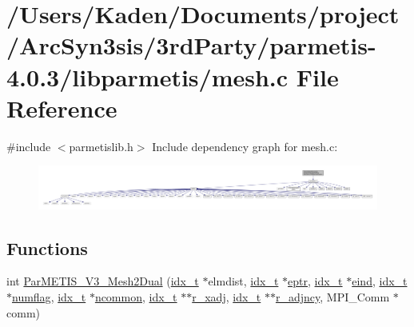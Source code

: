 \hypertarget{a00930}{}\section{/\+Users/\+Kaden/\+Documents/project/\+Arc\+Syn3sis/3rd\+Party/parmetis-\/4.0.3/libparmetis/mesh.c File Reference}
\label{a00930}
{\ttfamily \#include $<$parmetislib.\+h$>$}\newline
Include dependency graph for mesh.\+c\+:\nopagebreak
\begin{figure}[H]
\begin{center}
\leavevmode
\includegraphics[width=350pt]{a00931}
\end{center}
\end{figure}
\subsection*{Functions}
\begin{DoxyCompactItemize}
\item 
int \hyperlink{a00930_ab2b3727a0cfbdf8b75768c33487fa9f4}{Par\+M\+E\+T\+I\+S\+\_\+\+V3\+\_\+\+Mesh2\+Dual} (\hyperlink{a00876_aaa5262be3e700770163401acb0150f52}{idx\+\_\+t} $\ast$elmdist, \hyperlink{a00876_aaa5262be3e700770163401acb0150f52}{idx\+\_\+t} $\ast$\hyperlink{a00879_af3ca47b5acd610d8d94e45e3480b2583}{eptr}, \hyperlink{a00876_aaa5262be3e700770163401acb0150f52}{idx\+\_\+t} $\ast$\hyperlink{a00879_af06d5753771b844d01c4c20e75c6401b}{eind}, \hyperlink{a00876_aaa5262be3e700770163401acb0150f52}{idx\+\_\+t} $\ast$\hyperlink{a00879_aa48ecaf34ec788199c3aedb2b1558eb7}{numflag}, \hyperlink{a00876_aaa5262be3e700770163401acb0150f52}{idx\+\_\+t} $\ast$\hyperlink{a00879_a1a215d5e3b7fb6675cd2e6266772b752}{ncommon}, \hyperlink{a00876_aaa5262be3e700770163401acb0150f52}{idx\+\_\+t} $\ast$$\ast$\hyperlink{a00879_ab92af26e448291b7932687dee45298df}{r\+\_\+xadj}, \hyperlink{a00876_aaa5262be3e700770163401acb0150f52}{idx\+\_\+t} $\ast$$\ast$\hyperlink{a00879_ad0152ea85617e06eb0e2d9f386150411}{r\+\_\+adjncy}, M\+P\+I\+\_\+\+Comm $\ast$comm)
\end{DoxyCompactItemize}


